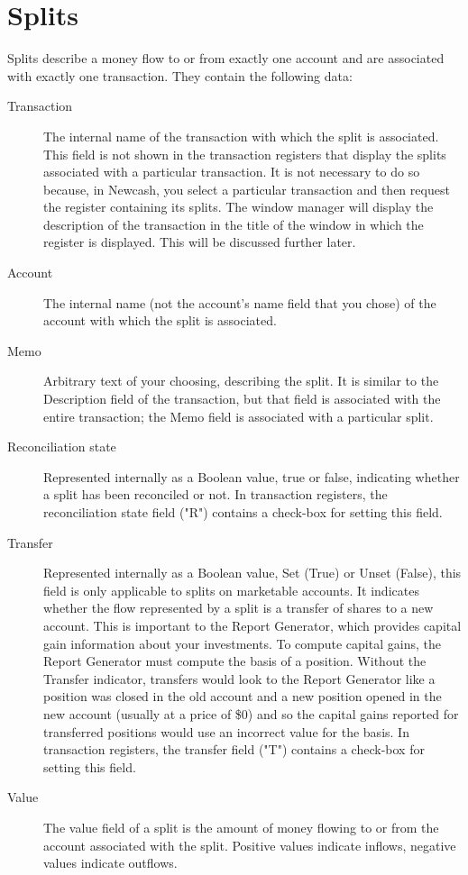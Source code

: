 \documentclass{report}
\begin{document}
\section{Splits} 
\label{Splits} 
Splits describe a money flow to or from exactly one account and are associated with exactly one transaction. They contain the following data:
\begin{description}
\item [Transaction] The internal name of the transaction with which the split is associated. This field is not shown in the transaction registers that display the splits associated with a particular transaction. It is not necessary to do so because, in Newcash, you select a particular transaction and then request the register containing its splits. The window manager will display the description of the transaction in the title of the window in which the register is displayed. This will be discussed further later.
\item [Account] The internal name (not the account's name field that you chose) of the account with which the split is associated.
\item [Memo] Arbitrary text of your choosing, describing the split. It is similar to the Description field of the transaction, but that field is associated with the entire transaction; the Memo field is associated with a particular split.
\item [Reconciliation state] Represented internally as a Boolean value, true or false, indicating whether a split has been reconciled or not. In transaction registers, the reconciliation state field ("R") contains a check-box for setting this field.
\item [Transfer] Represented internally as a Boolean value, Set (True) or Unset (False), this field is only applicable to splits on marketable accounts. It indicates whether the flow represented by a split is a transfer of shares to a new account. This is important to the Report Generator, which provides capital gain information about your investments. To compute capital gains, the Report Generator must compute the basis of a position. Without the Transfer indicator, transfers would look to the Report Generator like a position was closed in the old account and a new position opened in the new account (usually at a price of \$0) and so the capital gains reported for transferred positions would use an incorrect value for the basis. In transaction registers, the transfer field ("T") contains a check-box for setting this field.
\item [Value] The value field of a split is the amount of money flowing to or from the account associated with the split. Positive values indicate inflows, negative values indicate outflows.

\end{description}
\end{document}
